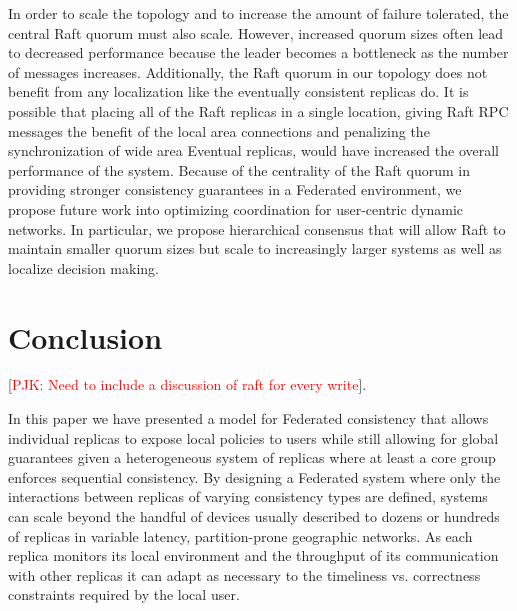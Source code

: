\documentclass[10pt,conference,letterpaper]{IEEEtran}
\newcommand{\todo}[1]{{\textcolor{red}{#1}}}
\newcommand{\pjk}[1]{[\todo{PJK: #1}]}
\begin{document}
In order to scale the topology and to increase the amount of failure tolerated, the central Raft quorum must also scale. However, increased quorum sizes often lead to decreased performance because the leader becomes a bottleneck as the number of messages increases. Additionally, the Raft quorum in our topology does not benefit from any localization like the eventually consistent replicas do. It is possible that placing all of the Raft replicas in a single location, giving Raft RPC messages the benefit of the local area connections and penalizing the synchronization of wide area Eventual replicas, would have increased the overall performance of the system. Because of the centrality of the Raft quorum in providing stronger consistency guarantees in a Federated environment, we propose future work into optimizing coordination for user-centric dynamic networks. In particular, we propose hierarchical consensus that will allow Raft to maintain smaller quorum sizes but scale to increasingly larger systems as well as localize decision making.

\section{Conclusion}

\pjk{Need to include a discussion of raft for every write}.

In this paper we have presented a model for Federated consistency that allows individual replicas to expose local policies to users while still allowing for global guarantees given a heterogeneous system of replicas where at least a core group enforces sequential consistency. By designing a Federated system where only the interactions between replicas of varying consistency types are defined, systems can scale beyond the handful of devices usually described to dozens or hundreds of replicas in variable latency, partition-prone geographic networks. As each replica monitors its local environment and the throughput of its communication with other replicas it can adapt as necessary to the timeliness vs. correctness constraints required by the local user.

%



\end{document}
